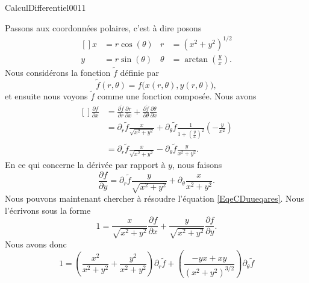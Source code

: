 \begin{corrige}{CalculDifferentiel0011}

	Passons aux coordonnées polaires, c'est à dire posons
	\begin{equation}
		\begin{aligned}[]
			x&=r\cos(\theta)	&r&=(x^2+y^2)^{1/2}\\
			y&=r\sin(\theta)	&\theta&=\arctan\left( \frac{ y }{ x } \right).
		\end{aligned}
	\end{equation}
	Nous considérons la fonction $\tilde f$ définie par
	\begin{equation}		\label{EqeCDchemuudevarfftrtxy}
		\tilde f(r,\theta)=f\big( x(r,\theta),y(r,\theta) \big),
	\end{equation}
	et ensuite nous voyons $\tilde f$ comme une fonction composée. Nous avons
	\begin{equation}
		\begin{aligned}[]
			\frac{ \partial f }{ \partial x }&=\frac{ \partial \tilde f }{ \partial r }\frac{ \partial r }{ \partial x }+\frac{ \partial \tilde f }{ \partial \theta }\frac{ \partial \theta }{ \partial x }\\
			&=\partial_r\tilde f\frac{ x }{ \sqrt{x^2+y^2} }+\partial_{\theta}\tilde f\frac{1}{ 1+\left( \frac{ y }{ x } \right)^2 }\left( -\frac{ y }{ x^2 } \right)\\
			&=\partial_r\tilde f\frac{ x }{ \sqrt{x^2+y^2} }-\partial_{\theta}\tilde f\frac{ y }{ x^2+y^2 }.
		\end{aligned}
	\end{equation}
	En ce qui concerne la dérivée par rapport à $y$, nous faisons
	\begin{equation}
		\frac{ \partial f }{ \partial y }=\partial_r\tilde f\frac{ y }{ \sqrt{x^2+y^2} }+\partial_{\theta}\frac{ x }{ x^2+y^2 }.
	\end{equation}
	Nous pouvons maintenant chercher à résoudre l'équation \eqref{EqeCDuueqares}. Nous l'écrivons sous la forme
	\begin{equation}
		1=\frac{ x }{ \sqrt{x^2+y^2} }\frac{ \partial f }{ \partial x }+\frac{ y }{ \sqrt{x^2+y^2} }\frac{ \partial f }{ \partial y }.
	\end{equation}
	Nous avons donc
	\begin{equation}
		1=\left( \frac{ x^2 }{ x^2+y^2 }+\frac{ y^2 }{ x^2+y^2 } \right)\partial_{r}\tilde f+\left( \frac{ -yx+xy }{ (x^2+y^2)^{3/2} } \right)\partial_{\theta}\tilde f
	\end{equation}

\end{corrige}
